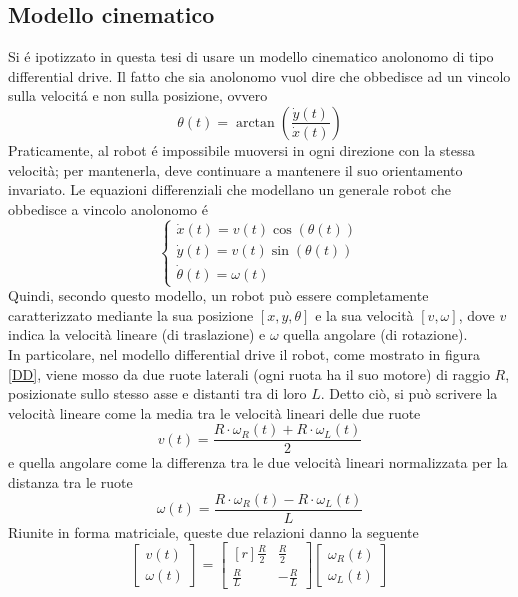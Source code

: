 \documentclass[14pt,a4paper]{extarticle}
\begin{document}
\subsection{Modello cinematico}
Si é ipotizzato in questa tesi di usare un modello cinematico anolonomo di tipo differential drive. Il fatto che sia anolonomo vuol dire che obbedisce ad un vincolo sulla velocitá e non sulla posizione, ovvero \[\theta(t) = \arctan \left( \frac{\dot{y}(t)}{\dot{x}(t)} \right) \] Praticamente, al robot é impossibile muoversi in ogni direzione con la stessa velocità; per mantenerla, deve continuare a mantenere il suo orientamento invariato. Le equazioni differenziali che modellano un generale robot che obbedisce a vincolo anolonomo é
\begin{equation}
\label{anolomeq}
\begin{cases}
\dot{x}(t) = v(t)\cos(\theta(t)) \\
\dot{y}(t) = v(t)\sin(\theta(t)) \\
\dot{\theta}(t) = \omega(t)
\end{cases}
\end{equation} 
Quindi, secondo questo modello, un robot può essere completamente caratterizzato mediante la sua posizione \([x,y,\theta]\) e la sua velocità \([v,\omega]\), dove \(v\) indica la velocità lineare (di traslazione) e \(\omega\) quella angolare (di rotazione).\\
In particolare, nel modello differential drive il robot, come mostrato in figura \ref{DD}, viene mosso da due ruote laterali (ogni ruota ha il suo motore) di raggio \(R\), posizionate sullo stesso asse e distanti tra di loro \(L\). Detto ciò, si può scrivere la velocità lineare come la media tra le velocità lineari delle due ruote \[v(t)=\frac{R\cdot\omega_R(t)+R\cdot\omega_L(t)}{2}\] e quella angolare come la differenza tra le due velocità lineari normalizzata per la distanza tra le ruote \[\omega(t)=\frac{R\cdot\omega_R(t)-R\cdot\omega_L(t)}{L}\] Riunite in forma matriciale, queste due relazioni danno la seguente
\begin{equation}
\begin{bmatrix}
v(t) \\
\omega(t)
\end{bmatrix}
=
\begin{bmatrix*}[r]
\frac{R}{2} & \frac{R}{2} \\
\frac{R}{L} & -\frac{R}{L}
\end{bmatrix*}
\begin{bmatrix}
\omega_R(t) \\
\omega_L(t)
\end{bmatrix}
\end{equation} 
\end{document}
